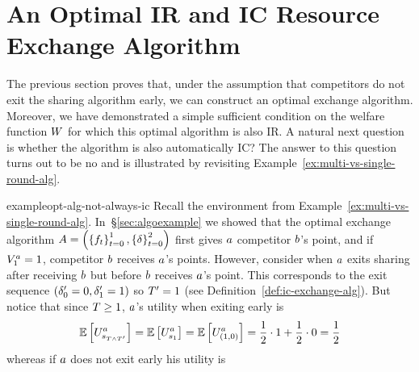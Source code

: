 \section{An Optimal IR and IC Resource Exchange Algorithm}
\label{sec:opt-ic-alg}

The previous section proves that,
under the assumption that competitors do not exit the sharing algorithm early,
we can construct an optimal exchange algorithm. Moreover, we have demonstrated a simple sufficient condition
on the welfare function $W$ for which this optimal algorithm is also IR. A natural next question is 
whether the algorithm is also automatically IC?
The answer to this question turns out to be no and is illustrated by revisiting Example~\ref{ex:multi-vs-single-round-alg}. 

\begin{restatable}{example}{opt-alg-not-always-ic}
    Recall the environment from Example~\ref{ex:multi-vs-single-round-alg}. In~\S\ref{sec:algoexample}
    we showed that the optimal exchange algorithm 
    \(
        A
        =
        \left(
            \left\{f_{t}\right\}_{t=0}^{1},
            \left\{\delta\right\}_{t=0}^{2}
        \right)
    \)
    first gives $a$ competitor $b$'s point,
    and if $V^a_{1}=1$, competitor $b$ receives $a$'s points. However, consider when
    $a$ exits sharing after receiving $b$ but before $b$ receives
    $a$'s point. This corresponds to the exit sequence 
    \(
        \left(
            \delta'_{0} = 0,
            \delta'_{1} = 1
        \right)
    \) so 
    $T'=1$ (see Definition~\ref{def:ic-exchange-alg}). But notice that since 
    $T\geq 1$, 
    $a$'s utility when exiting early is
    \begin{align*}
        \mathbb{E}\left[
            U^a_{
                s_{
                    T\wedge T'
                }
            }
        \right]
        =
        \mathbb{E}\left[
            U^a_{
                s_{
                    1
                }
            }
        \right]
        =
        \mathbb{E}\left[
            U^a_{
                (1,0)
            }
        \right]
        =
        \frac{1}{2}\cdot 1 + \frac{1}{2} \cdot 0
        =
        \frac{1}{2}
    \end{align*}  
    whereas if $a$ does not exit early his utility is

\end{restatable}
